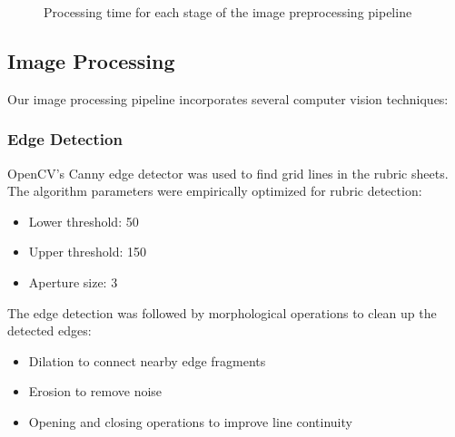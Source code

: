 \documentclass[12pt]{article}
\begin{document}
\begin{figure}[H]
    \centering
    \caption{Processing time for each stage of the image preprocessing pipeline}
    \label{fig:preprocessing}
\end{figure}

\subsection{Image Processing}
Our image processing pipeline incorporates several computer vision techniques:

\subsubsection{Edge Detection}
OpenCV's Canny edge detector was used to find grid lines in the rubric sheets. The algorithm parameters were empirically optimized for rubric detection:
\begin{itemize}
    \item Lower threshold: 50
    \item Upper threshold: 150
    \item Aperture size: 3
\end{itemize}

The edge detection was followed by morphological operations to clean up the detected edges:
\begin{itemize}
    \item Dilation to connect nearby edge fragments
    \item Erosion to remove noise
    \item Opening and closing operations to improve line continuity
\end{itemize}
\end{document}
